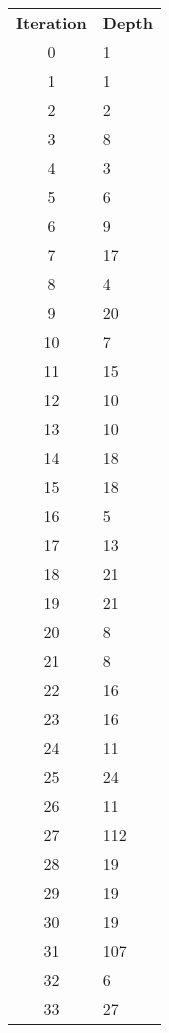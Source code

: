 \documentclass[12pt]{scrartcl}
\begin{document}
\begin{minipage}[t]{.30\textwidth}
    \centering
    \begin{tabular}{cl}
        \textbf{Iteration} & \textbf{Depth} \\
        0 &     1\\
        1 &     1\\
        2 &     2\\
        3 &     8\\
        4 &     3\\
        5 &     6\\
        6 &     9\\
        7 &    17\\
        8 &     4\\
        9 &    20\\
        10 &     7\\
        11 &    15\\
        12 &    10\\
        13 &    10\\
        14 &    18\\
        15 &    18\\
        16 &     5\\
        17 &    13\\
        18 &    21\\
        19 &    21\\
        20 &     8\\
        21 &     8\\
        22 &    16\\
        23 &    16\\
        24 &    11\\
        25 &    24\\
        26 &    11\\
        27 &   112\\
        28 &    19\\
        29 &    19\\
        30 &    19\\
        31 &   107\\
        32 &     6\\
        33 &    27\\
    \end{tabular}
\end{minipage}\hfil
\end{document}

